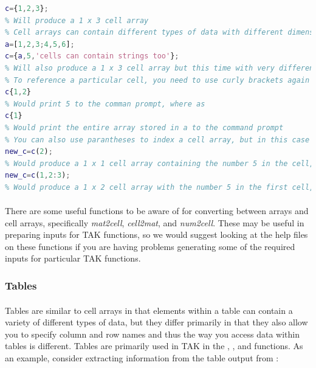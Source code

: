 \begin{lstlisting}[language=Matlab]
% Making a cell array is similar to making an array, except you use curly brackets instead of square brackets
c={1,2,3};
% Will produce a 1 x 3 cell array
% Cell arrays can contain different types of data with different dimensions in each cell
a=[1,2,3;4,5,6];
c={a,5,'cells can contain strings too'};
% Will also produce a 1 x 3 cell array but this time with very different data stored in each cell
% To reference a particular cell, you need to use curly brackets again
c{1,2}
% Would print 5 to the comman prompt, where as
c{1}
% Would print the entire array stored in a to the command prompt
% You can also use parantheses to index a cell array, but in this case the result is a new cell array just containing the cells you specified
new_c=c(2);
% Would produce a 1 x 1 cell array containing the number 5 in the cell, whereas
new_c=c(1,2:3);
% Would produce a 1 x 2 cell array with the number 5 in the first cell, and the string 'cells can contain strings too' in the second cell
\end{lstlisting}

\paragraph{}There are some useful functions to be aware of for converting between arrays and cell arrays, specifically \textit{mat2cell}, \textit{cell2mat}, and \textit{num2cell}. These may be useful in preparing inputs for TAK functions, so we would suggest looking at the help files on these functions if you are having problems generating some of the required inputs for particular TAK functions.

\subsubsection{Tables}
\paragraph{}Tables are similar to cell arrays in that elements within a table can contain a variety of different types of data, but they differ primarily in that they also allow you to specify column and row names and thus the way you access data within tables is different. Tables are primarily used in TAK in the , , and  functions. As an example, consider extracting information from the table output from :

